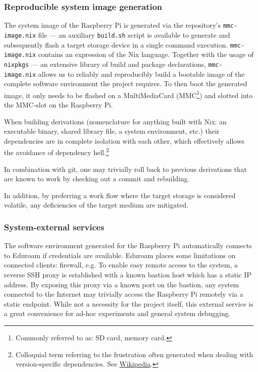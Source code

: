 \subsubsection{Reproducible system image generation}
The system image of the Raspberry Pi is generated via the repository's \texttt{mmc-image.nix} file ---
an auxiliary \texttt{build.sh} script is available to generate and subsequently flash a target storage device in a single command execution.
\texttt{mmc-image.nix} contains an expression of the Nix language.
Together with the usage of \texttt{nixpkgs} --- an extensive library of build and package declarations,
\texttt{mmc-image.nix} allows us to reliably and reproducibly build a bootable image of the complete software environment the project requires.
To then boot the generated image, it only needs to be flashed on a MultiMediaCard (MMC\footnote{Commonly referred to as: SD card, memory card.}) and slotted into the MMC-slot on the Raspberry Pi.

When building derivations (nomenclature for anything built with Nix: an executable binary, shared library file, a system environment, etc.) their dependencies are in complete isolation with each other, which effectively allows the avoidance of dependency hell.\footnote{Colloquial term referring to the frustration often generated when dealing with version-specific dependencies.
See \href{https://en.wikipedia.org/wiki/Dependency_hell}{Wikipedia}.}

In combination with git, one may trivially roll back to previous derivations that are known to work by checking out a commit and rebuilding.

In addition, by preferring a work flow where the target storage is considered volatile, any deficiencies of the target medium are mitigated.

\subsubsection{System-external services}
The software environment generated for the Raspberry Pi automatically connects to Eduroam if credentials are available.
Eduroam places some limitations on connected clients: firewall, e.g.
To enable easy remote access to the system, a reverse SSH proxy is established with a known bastion host which has a static IP address.
By exposing this proxy via a known port on the bastion, any system connected to the Internet may trivially access the Raspberry Pi remotely via a static endpoint.
While not a necessity for the project itself, this external service is a great convenience for ad-hoc experiments and general system debugging.

